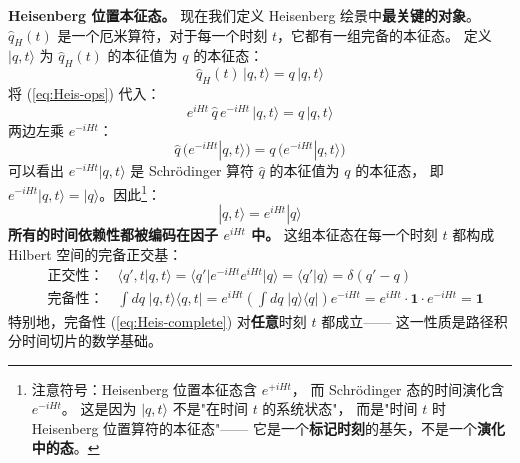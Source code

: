 \vspace{8pt}
\noindent\textbf{Heisenberg 位置本征态。}
现在我们定义 Heisenberg 绘景中\textbf{最关键的对象}。
$\hat{q}_H(t)$ 是一个厄米算符，对于每一个时刻 $t$，它都有一组完备的本征态。
定义 $|q,t\rangle$ 为 $\hat{q}_H(t)$ 的本征值为 $q$ 的本征态：
\begin{equation}\label{eq:Heis-eigen-def}
  \hat{q}_H(t)\,|q,t\rangle = q\,|q,t\rangle
\end{equation}
将 (\ref{eq:Heis-ops}) 代入：
\[
  e^{iHt}\,\hat{q}\,e^{-iHt}\,|q,t\rangle = q\,|q,t\rangle
\]
两边左乘 $e^{-iHt}$：
\[
  \hat{q}\,\bigl(e^{-iHt}|q,t\rangle\bigr)
  = q\,\bigl(e^{-iHt}|q,t\rangle\bigr)
\]
可以看出 $e^{-iHt}|q,t\rangle$ 是 Schr\"odinger 算符 $\hat{q}$ 的本征值为 $q$ 的本征态，
即 $e^{-iHt}|q,t\rangle = |q\rangle$。因此\footnote{
注意符号：Heisenberg 位置本征态含 $e^{+iHt}$，
而 Schr\"odinger 态的时间演化含 $e^{-iHt}$。
这是因为 $|q,t\rangle$ 不是"在时间 $t$ 的系统状态"，
而是"时间 $t$ 时 Heisenberg 位置算符的本征态"——
它是一个\textbf{标记时刻}的基矢，不是一个\textbf{演化中的态}。}：
\begin{equation}\label{eq:Heis-eigenstate}
\boxed{
  |q,t\rangle = e^{iHt}|q\rangle
}
\end{equation}
\textbf{所有的时间依赖性都被编码在因子 $e^{iHt}$ 中。}
这组本征态在每一个时刻 $t$ 都构成 Hilbert 空间的完备正交基：
\begin{align}
  &\text{正交性：}\quad
  \langle q',t|q,t\rangle = \langle q'|e^{-iHt}e^{iHt}|q\rangle = \langle q'|q\rangle
  = \delta(q'-q) \label{eq:Heis-ortho}\\[4pt]
  &\text{完备性：}\quad
  \int dq\;|q,t\rangle\langle q,t|
  = e^{iHt}\!\left(\int dq\;|q\rangle\langle q|\right)\!e^{-iHt}
  = e^{iHt}\cdot\mathbf{1}\cdot e^{-iHt} = \mathbf{1} \label{eq:Heis-complete}
\end{align}
特别地，完备性 (\ref{eq:Heis-complete}) 对\textbf{任意}时刻 $t$ 都成立——
这一性质是路径积分时间切片的数学基础。

